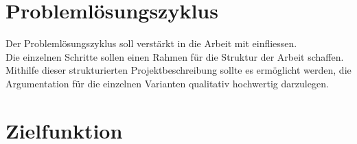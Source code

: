 \documentclass[
  paper=a4,                         %
  fontsize=11pt,                    %
  DIV=12,                           %
  BCOR=10mm,                        %
  twoside=true,                     %
  parskip=half,                     %
  headings=small,                   %
 ]{scrartcl}
\begin{document}
\section{\large Problemlösungszyklus}

Der Problemlösungszyklus soll verstärkt in die Arbeit mit einfliessen. \\ Die einzelnen \mbox Schritte sollen einen Rahmen für die Struktur der Arbeit schaffen. Mithilfe dieser strukturierten Projektbeschreibung sollte es ermöglicht werden, die Argumentation für die einzelnen Varianten qualitativ hochwertig darzulegen.  


\section{\large Zielfunktion}
\end{document}
